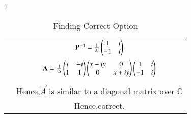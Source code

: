\begin{table*}[ht!]{1}
\begin{center}
\begin{tabular}{|c|c|}
&$\mathbf{P^{-1}}=\frac{1}{2i}\begin{pmatrix}1&i\\-1&i\end{pmatrix}$\\
&$\mathbf{A}=\frac{1}{2i}\begin{pmatrix}i&-i\\1&1\end{pmatrix}\begin{pmatrix}x-iy&0\\0&x+iy\end{pmatrix}\begin{pmatrix}1&i\\-1&i\end{pmatrix}$\\
&\\
&Hence,$\vec{A}$ is similar to a diagonal matrix over $\mathbb{C}$\\
&Hence,correct.\\
\hline
\end{tabular}
\end{center}
\caption{Finding Correct Option}
\label{eq:solutions/2014/dec/90/table1}
\end{table*}

 
